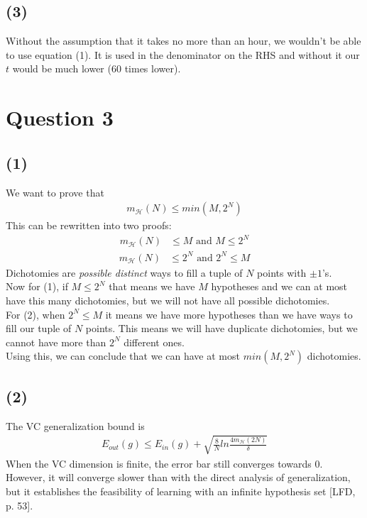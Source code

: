 \documentclass[a4paper]{article}
\begin{document}
\subsection*{(3)}
Without the assumption that it takes no more than an hour, we wouldn't be able to use equation (1). It is used in the denominator on the RHS and without it our $t$ would be much lower ($60$ times lower).

\newpage
\section*{Question 3}
\subsection*{(1)}
We want to prove that
\begin{align*}
m_\mathcal{H}(N)\leq min(M,2^N)
\end{align*}
This can be rewritten into two proofs:
\begin{align}
m_\mathcal{H}(N)&\leq M \mbox{  and  }M\leq 2^N
\end{align}
\begin{align}
m_\mathcal{H}(N)&\leq 2^N \mbox{  and  }2^N\leq M
\end{align}
Dichotomies are \textit{possible distinct} ways to fill a tuple of $N$ points with $\pm 1$'s.\\
Now for (1), if $M\leq 2^N$ that means we have $M$ hypotheses and we can at most have this many dichotomies, but we will not have all possible dichotomies. \\
For (2), when $2^N \leq M$ it means we have more hypotheses than we have ways to fill our tuple of $N$ points. This means we will have duplicate dichotomies, but we cannot have more than $2^N$ different ones.\\
Using this, we can conclude that we can have at most $min(M, 2^N)$ dichotomies.

\subsection*{(2)}
The VC generalization bound is
\begin{align*}
E_{out}(g)  \leq E_{in}(g)+\sqrt{\frac{8}{N}ln\frac{4m_\mathcal{H}(2N)}{\delta}}
\end{align*}
When the VC dimension is finite, the error bar still converges towards $0$. However, it will converge slower than with the direct analysis of generalization, but it establishes the feasibility of learning with an infinite hypothesis set [LFD, p. 53].
\end{document}
